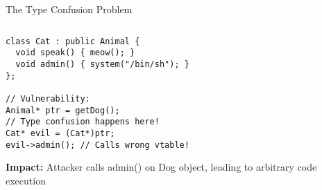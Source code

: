 \documentclass[aspectratio=169,12pt]{beamer}
\begin{document}
\begin{frame}[fragile]{The Type Confusion Problem}
\begin{columns}
\begin{column}{0.5\textwidth}
\begin{tcolorbox}[colback=gray!10]
\begin{verbatim}
class Cat : public Animal {
  void speak() { meow(); }
  void admin() { system("/bin/sh"); }
};

// Vulnerability:
Animal* ptr = getDog();
// Type confusion happens here!
Cat* evil = (Cat*)ptr;
evil->admin(); // Calls wrong vtable!
                \end{verbatim}
            \end{tcolorbox}
            
            \begin{tcolorbox}[colback=red!10]
                \small
                \textbf{Impact:} Attacker calls admin() on Dog object, leading to arbitrary code execution
            \end{tcolorbox}
        \end{column}
    \end{columns}
\end{frame}
\end{document}
